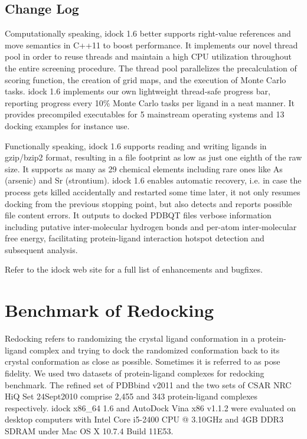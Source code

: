 \documentclass{bioinfo}
\begin{document}
\begin{methods}
\section{Change Log}

Computationally speaking, idock 1.6 better supports right-value references and move semantics in C++11 to boost performance. It implements our novel thread pool in order to reuse threads and maintain a high CPU utilization throughout the entire screening procedure. The thread pool parallelizes the precalculation of scoring function, the creation of grid maps, and the execution of Monte Carlo tasks. idock 1.6 implements our own lightweight thread-safe progress bar, reporting progress every 10\% Monte Carlo tasks per ligand in a neat manner. It provides precompiled executables for 5 mainstream operating systems and 13 docking examples for instance use.

Functionally speaking, idock 1.6 supports reading and writing ligands in gzip/bzip2 format, resulting in a file footprint as low as just one eighth of the raw size. It supports as many as 29 chemical elements including rare ones like As (arsenic) and Sr (strontium). idock 1.6 enables automatic recovery, i.e. in case the process gets killed accidentally and restarted some time later, it not only resumes docking from the previous stopping point, but also detects and reports possible file content errors. It outputs to docked PDBQT files verbose information including putative inter-molecular hydrogen bonds and per-atom inter-molecular free energy, facilitating protein-ligand interaction hotspot detection and subsequent analysis.

Refer to the idock web site for a full list of enhancements and bugfixes.

\end{methods}

\section{Benchmark of Redocking}

Redocking refers to randomizing the crystal ligand conformation in a protein-ligand complex and trying to dock the randomized conformation back to its crystal conformation as close as possible. Sometimes it is referred to as pose fidelity. We used two datasets of protein-ligand complexes for redocking benchmark. The refined set of PDBbind v2011 \citep{530} and the two sets of CSAR NRC HiQ Set 24Sept2010 \citep{857} comprise 2,455 and 343 protein-ligand complexes respectively. idock x86\_64 1.6 and AutoDock Vina x86 v1.1.2 were evaluated on desktop computers with Intel Core i5-2400 CPU @ 3.10GHz and 4GB DDR3 SDRAM under Mac OS X 10.7.4 Build 11E53.
\end{document}
